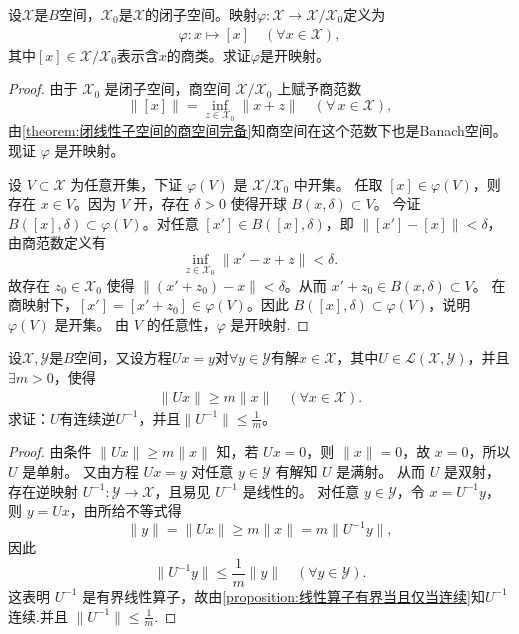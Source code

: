 \documentclass[../../main.tex]{subfiles}%
\begin{document}
\begin{example}
设$\mathscr{X}$是$B$空间，$\mathscr{X}_0$是$\mathscr{X}$的闭子空间。映射$\varphi:\mathscr{X}\to\mathscr{X}/\mathscr{X}_0$定义为
\begin{align*}
\varphi:x\mapsto [x]\quad (\forall x\in\mathscr{X}),
\end{align*}
其中$[x]\in \mathscr{X}/\mathscr{X}_0$表示含$x$的商类。求证$\varphi$是开映射。
\end{example}
\begin{proof}

由于 $\mathscr{X}_0$ 是闭子空间，商空间 $\mathscr{X}/\mathscr{X}_0$ 上赋予商范数
\[
\|[x]\| = \inf_{z\in\mathscr{X}_0} \|x+z\| \quad (\forall\,x\in\mathscr{X}),
\]
由\cref{theorem:闭线性子空间的商空间完备}知商空间在这个范数下也是Banach空间。现证 $\varphi$ 是开映射。

设 $V\subset\mathscr{X}$ 为任意开集，下证 $\varphi(V)$ 是 $\mathscr{X}/\mathscr{X}_0$ 中开集。
任取 $[x]\in\varphi(V)$，则存在 $x\in V$。因为 $V$ 开，存在 $\delta>0$ 使得开球 $B(x,\delta)\subset V$。
今证 $B([x],\delta)\subset\varphi(V)$。对任意 $[x']\in B([x],\delta)$，即 $\|[x']-[x]\|<\delta$，由商范数定义有
\[
\inf_{z\in\mathscr{X}_0} \|x'-x+z\| < \delta.
\]
故存在 $z_0\in\mathscr{X}_0$ 使得 $\|(x'+z_0)-x\|<\delta$。从而 $x'+z_0\in B(x,\delta)\subset V$。
在商映射下，$[x']=[x'+z_0]\in\varphi(V)$。因此 $B([x],\delta)\subset\varphi(V)$，说明 $\varphi(V)$ 是开集。
由 $V$ 的任意性，$\varphi$ 是开映射.
\end{proof}

\begin{example}
设$\mathscr{X},\mathscr{Y}$是$B$空间，又设方程$Ux=y$对$\forall y\in\mathscr{Y}$有解$x\in\mathscr{X}$，其中$U\in\mathscr{L}(\mathscr{X},\mathscr{Y})$，并且$\exists m>0$，使得
\begin{align*}
\|Ux\|\geqslant m\|x\|\quad (\forall x\in\mathscr{X}).
\end{align*}
求证：$U$有连续逆$U^{-1}$，并且$\|U^{-1}\|\leqslant \frac{1}{m}$。
\end{example}
\begin{proof}
由条件 $\|Ux\|\geqslant m\|x\|$ 知，若 $Ux=0$，则 $\|x\|=0$，故 $x=0$，所以 $U$ 是单射。
又由方程 $Ux=y$ 对任意 $y\in\mathscr{Y}$ 有解知 $U$ 是满射。
从而 $U$ 是双射，存在逆映射 $U^{-1}:\mathscr{Y}\to\mathscr{X}$，且易见 $U^{-1}$ 是线性的。
对任意 $y\in\mathscr{Y}$，令 $x=U^{-1}y$，则 $y=Ux$，由所给不等式得
\[
\|y\| = \|Ux\| \geqslant m\|x\| = m\|U^{-1}y\|,
\]
因此
\[
\|U^{-1}y\| \leqslant \frac{1}{m}\|y\| \quad (\forall y\in\mathscr{Y}).
\]
这表明 $U^{-1}$ 是有界线性算子，故由\cref{proposition:线性算子有界当且仅当连续}知$U^{-1}$ 连续.并且 $\|U^{-1}\|\leqslant \frac{1}{m}$.
\end{proof}
\end{document}
